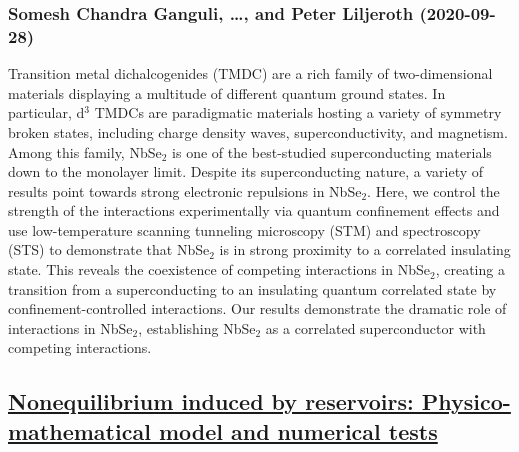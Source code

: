 \subsubsection*{Somesh Chandra Ganguli, \dots, and Peter Liljeroth (2020-09-28)}
Transition metal dichalcogenides (TMDC) are a rich family of two-dimensional
materials displaying a multitude of different quantum ground states. In
particular, d$^3$ TMDCs are paradigmatic materials hosting a variety of
symmetry broken states, including charge density waves, superconductivity, and
magnetism. Among this family, NbSe$_2$ is one of the best-studied
superconducting materials down to the monolayer limit. Despite its
superconducting nature, a variety of results point towards strong electronic
repulsions in NbSe$_2$. Here, we control the strength of the interactions
experimentally via quantum confinement effects and use low-temperature scanning
tunneling microscopy (STM) and spectroscopy (STS) to demonstrate that NbSe$_2$
is in strong proximity to a correlated insulating state. This reveals the
coexistence of competing interactions in NbSe$_2$, creating a transition from a
superconducting to an insulating quantum correlated state by
confinement-controlled interactions. Our results demonstrate the dramatic role
of interactions in NbSe$_2$, establishing NbSe$_2$ as a correlated
superconductor with competing interactions.

\subsection*{\href{http://arxiv.org/abs/2009.13414v1}{Nonequilibrium induced by reservoirs: Physico-mathematical model and  numerical tests}}
